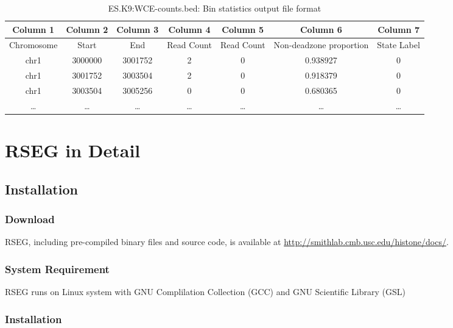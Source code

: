\documentclass[11pt]{report}
\begin{document}
\begin{table}[th]
  \centering
  \begin{tabular}{c c c c c c c }
    Column 1 & Column 2 & Column 3 &  Column 4 & Column 5 &  Column 6
    & Column 7\\
    \hline
    Chromosome  & Start & End & Read Count & Read Count & Non-deadzone proportion &
    State Label \\
    \hline
chr1&    3000000& 3001752& 2&       0&       0.938927&        0\\
chr1&    3001752& 3003504& 2&       0&       0.918379&        0\\
chr1&    3003504& 3005256& 0&       0&       0.680365&        0\\
    \ldots & \ldots &\ldots &\ldots &\ldots &\ldots & \ldots \\ 
    \hline
  \end{tabular}
  \caption{ES.K9:WCE-counts.bed: Bin statistics output file format}
  \label{tab:format-bin-diff}
\end{table}


\chapter{RSEG in Detail}
\label{chap:rseg-manual}

\section{Installation}
\label{sec:install}

\subsection*{Download}

RSEG, including pre-compiled binary files and source code, is
available at \url{http://smithlab.cmb.usc.edu/histone/docs/}.

\subsection*{System Requirement}

RSEG runs on Linux system with GNU Complilation Collection (GCC) and
GNU Scientific Library (GSL)

\subsection*{Installation}
\end{document}
